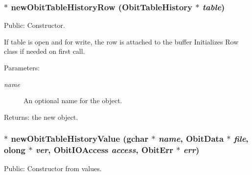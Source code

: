 \subsubsection{$\ast$ new\-Obit\-Table\-History\-Row ({\bf Obit\-Table\-History} $\ast$ {\em table})}\label{ObitTableHistory_8h_a8}


Public: Constructor. 

If table is open and for write, the row is attached to the buffer Initializes Row class if needed on first call. \begin{Desc}
\item[Parameters:]
\begin{description}
\item[{\em name}]An optional name for the object. \end{description}
\end{Desc}
\begin{Desc}
\item[Returns:]the new object. \end{Desc}
\subsubsection{$\ast$ new\-Obit\-Table\-History\-Value (gchar $\ast$ {\em name}, {\bf Obit\-Data} $\ast$ {\em file}, {\bf olong} $\ast$ {\em ver}, Obit\-IOAccess {\em access}, {\bf Obit\-Err} $\ast$ {\em err})}\label{ObitTableHistory_8h_a12}


Public: Constructor from values. 

